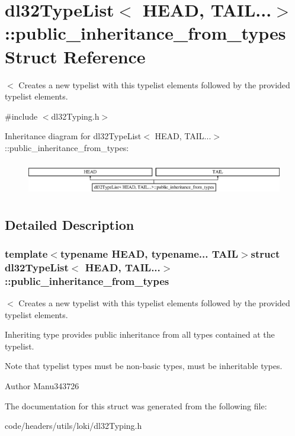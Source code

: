 \hypertarget{structdl32_type_list_3_01_h_e_a_d_00_01_t_a_i_l_8_8_8_4_1_1public__inheritance__from__types}{\section{dl32\-Type\-List$<$ H\-E\-A\-D, T\-A\-I\-L...$>$\-:\-:public\-\_\-inheritance\-\_\-from\-\_\-types Struct Reference}
\label{structdl32_type_list_3_01_h_e_a_d_00_01_t_a_i_l_8_8_8_4_1_1public__inheritance__from__types}
}


$<$ Creates a new typelist with this typelist elements followed by the provided typelist elements.  




{\ttfamily \#include $<$dl32\-Typing.\-h$>$}

Inheritance diagram for dl32\-Type\-List$<$ H\-E\-A\-D, T\-A\-I\-L...$>$\-:\-:public\-\_\-inheritance\-\_\-from\-\_\-types\-:\begin{figure}[H]
\begin{center}
\leavevmode
\includegraphics[height=1.509434cm]{structdl32_type_list_3_01_h_e_a_d_00_01_t_a_i_l_8_8_8_4_1_1public__inheritance__from__types}
\end{center}
\end{figure}


\subsection{Detailed Description}
\subsubsection*{template$<$typename H\-E\-A\-D, typename... T\-A\-I\-L$>$struct dl32\-Type\-List$<$ H\-E\-A\-D, T\-A\-I\-L...$>$\-::public\-\_\-inheritance\-\_\-from\-\_\-types}

$<$ Creates a new typelist with this typelist elements followed by the provided typelist elements. 

Inheriting type provides public inheritance from all types contained at the typelist.

Note that typelist types must be non-\/basic types, must be inheritable types.

\begin{DoxyAuthor}{Author}
Manu343726 
\end{DoxyAuthor}


The documentation for this struct was generated from the following file\-:\begin{DoxyCompactItemize}
\item 
code/headers/utils/loki/dl32\-Typing.\-h\end{DoxyCompactItemize}
